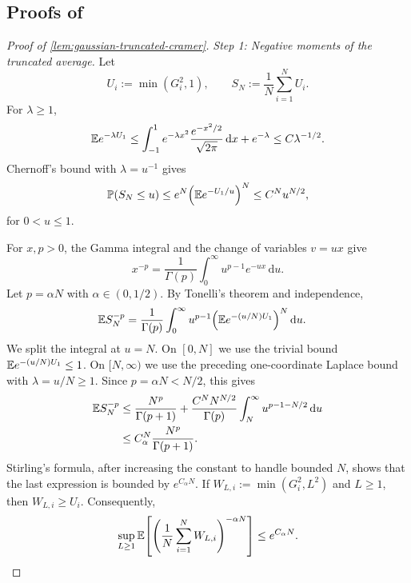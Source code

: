 \documentclass[11pt,reqno,a4paper]{article}
\newcommand{\Pp}{\P}
\newcommand{\Ee}{\E}
\begin{document}
\subsection{Proofs of
\texorpdfstring{}
{the results on negative moments}}
\label{app:supercritical-negative-moments}

\begin{proof}[Proof of \cref{lem:gaussian-truncated-cramer}]
  \emph{Step 1: Negative moments of the truncated average.}
  Let
  \begin{equation*}
    U_i:=\min(G_i^2,1),
    \qquad
    S_N:=\frac1N\sum_{i=1}^N U_i.
  \end{equation*}
  For $\lambda\geq1$,
  \begin{equation*}
    \Ee e^{-\lambda U_1}
    \leq
    \int_{-1}^1 e^{-\lambda x^2}\frac{e^{-x^2/2}}{\sqrt{2\pi}}\,\mathrm{d}x
    +
    e^{-\lambda}
    \leq
    C\lambda^{-1/2}.
  \end{equation*}
  Chernoff's bound with $\lambda=u^{-1}$ gives
  \begin{equation*}
    \Pp(S_N\leq u)
    \leq
    e^N
    \left(\Ee e^{-U_1/u}\right)^N
    \leq
    C^N u^{N/2},
  \end{equation*}
  for $0<u\leq1$.

  For $x,p>0$, the Gamma integral and the change of variables $v=ux$ give
  \begin{equation*}
    x^{-p}
    =
    \frac1{\Gamma(p)}
    \int_0^\infty u^{p-1}e^{-ux}\,\mathrm{d}u.
  \end{equation*}
  Let $p=\alpha N$ with $\alpha\in(0,1/2)$. By Tonelli's theorem and
  independence,
  \begin{align*}
    \Ee S_N^{-p}
    &=
    \frac1{\Gamma(p)}
    \int_0^\infty
    u^{p-1}
    \left(\Ee e^{-(u/N)U_1}\right)^N
    \,\mathrm{d}u .
  \end{align*}
  We split the integral at $u=N$. On $[0,N]$ we use the trivial bound
  $\Ee e^{-(u/N)U_1}\leq1$. On $[N,\infty)$ we use the preceding
  one-coordinate Laplace bound with $\lambda=u/N\geq1$. Since
  $p=\alpha N<N/2$, this gives
  \begin{align*}
    \Ee S_N^{-p}
    &\leq
    \frac{N^p}{\Gamma(p+1)}
    +
    \frac{C^N N^{N/2}}{\Gamma(p)}
    \int_N^\infty u^{p-1-N/2}\,\mathrm{d}u
    \\
    &\leq
    C_\alpha^N
    \frac{N^p}{\Gamma(p+1)}.
  \end{align*}
  Stirling's formula, after increasing the constant to handle bounded $N$,
  shows that the last expression is bounded by $e^{C_\alpha N}$.
  If $W_{L,i}:=\min(G_i^2,L^2)$ and $L\geq1$, then $W_{L,i}\geq U_i$.
  Consequently,
  \begin{equation}\label{eq:gaussian-truncated-negative-moment}
    \sup_{L\geq1}
    \Ee\left[
      \left(
        \frac1N\sum_{i=1}^N W_{L,i}
      \right)^{-\alpha N}
    \right]
    \leq
    e^{C_\alpha N}.
  \end{equation}


\end{proof}
\end{document}
